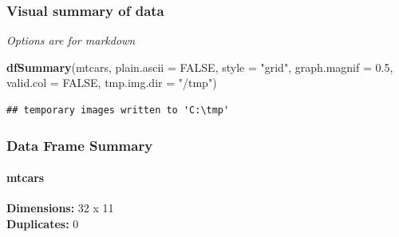 \documentclass[
]{article}
\newenvironment{Shaded}{\begin{snugshade}}{\end{snugshade}}
\newcommand{\AttributeTok}[1]{\textcolor[rgb]{0.13,0.29,0.53}{#1}}
\newcommand{\ConstantTok}[1]{\textcolor[rgb]{0.56,0.35,0.01}{#1}}
\newcommand{\FloatTok}[1]{\textcolor[rgb]{0.00,0.00,0.81}{#1}}
\newcommand{\FunctionTok}[1]{\textcolor[rgb]{0.13,0.29,0.53}{\textbf{#1}}}
\newcommand{\NormalTok}[1]{#1}
\newcommand{\StringTok}[1]{\textcolor[rgb]{0.31,0.60,0.02}{#1}}
\begin{document}
\hypertarget{visual-summary-of-data}{%
\subsubsection{Visual summary of data}\label{visual-summary-of-data}}

\emph{Options are for markdown}

\begin{Shaded}
\begin{Highlighting}[]
\FunctionTok{dfSummary}\NormalTok{(mtcars, }\AttributeTok{plain.ascii =} \ConstantTok{FALSE}\NormalTok{, }\AttributeTok{style =} \StringTok{"grid"}\NormalTok{, }
          \AttributeTok{graph.magnif =} \FloatTok{0.5}\NormalTok{, }\AttributeTok{valid.col =} \ConstantTok{FALSE}\NormalTok{, }\AttributeTok{tmp.img.dir =} \StringTok{"/tmp"}\NormalTok{)}
\end{Highlighting}
\end{Shaded}

\begin{verbatim}
## temporary images written to 'C:\tmp'
\end{verbatim}

\hypertarget{data-frame-summary}{%
\subsubsection{Data Frame Summary}\label{data-frame-summary}}

\hypertarget{mtcars}{%
\paragraph{mtcars}\label{mtcars}}

\textbf{Dimensions:} 32 x 11\\
\textbf{Duplicates:} 0
\end{document}
